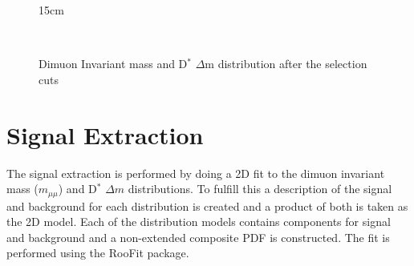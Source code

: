 \begin{figure}[!htm]{15cm}
  \caption{Dimuon Invariant mass and D$^*$ $\Delta$m distribution after the selection cuts}
  \label{fig:invmass_selection}
  \hfill
  \\
\end{figure}

\section{Signal Extraction}\label{sec:sig_extraction}

The signal extraction is performed by doing a 2D fit to the dimuon invariant mass ($m_{\mu\mu}$) and D$^*$ $\Delta m$ distributions. To fulfill this a description of the signal and background for each distribution is created and a product of both is taken as the 2D model. Each of the distribution models contains components for signal and background and a non-extended composite PDF is constructed. The fit is performed using the RooFit package.

